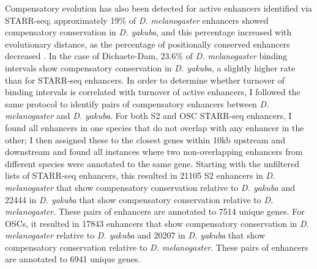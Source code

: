 Compensatory evolution has also been detected for active enhancers identified via STARR-seq; approximately 19\% of \emph{D. melanogaster} enhancers showed compensatory conservation in \emph{D. yakuba}, and this percentage increased with evolutionary distance, as the percentage of positionally conserved enhancers decreased \citep{arnold_quantitative_2014}. In the case of Dichaete-Dam, 23.6\% of \emph{D. melanogaster} binding intervals show compensatory conservation in \emph{D. yakuba}, a slightly higher rate than for STARR-seq enhancers. In order to determine whether turnover of binding intervals is correlated with turnover of active enhancers, I followed the same protocol to identify pairs of compensatory enhancers between \emph{D. melanogaster} and \emph{D. yakuba}. For both S2 and OSC STARR-seq enhancers, I found all enhancers in one species that do not overlap with any enhancer in the other; I then assigned these to the closest genes within 10kb upstream and downstream and found all instances where two non-overlapping enhancers from different species were annotated to the same gene. Starting with the unfiltered lists of STARR-seq enhancers, this resulted in 21105 S2 enhancers in \emph{D. melanogaster} that show compensatory conservation relative to \emph{D. yakuba} and 22444 in \emph{D. yakuba} that show compensatory conservation relative to \emph{D. melanogaster}. These pairs of enhancers are annotated to 7514 unique genes. For OSCs, it resulted in 17843 enhancers that show compensatory conservation in \emph{D. melanogaster} relative to \emph{D. yakuba} and 20207 in \emph{D. yakuba} that show compensatory conservation relative to \emph{D. melanogaster}. These pairs of enhancers are annotated to 6941 unique genes.\\

